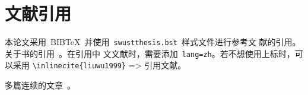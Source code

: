 \chapter{文献引用}\label{chap:refs}

本论文采用~BIB\TeX~并使用~\texttt{swustthesis.bst}~样式文件进行参考文
献的引用。关于书的引用~\cite{余敏2001出版集团研究,anwen1988}。在引用中
文文献时，需要添加~\texttt{lang=zh}。若不想使用上标时，可以采用
\verb|\inlinecite{liuwu1999}| =>  引用文献。

多篇连续的文章~\cite{1-11,a2-1,a2-2,a2-3,1-5}。
